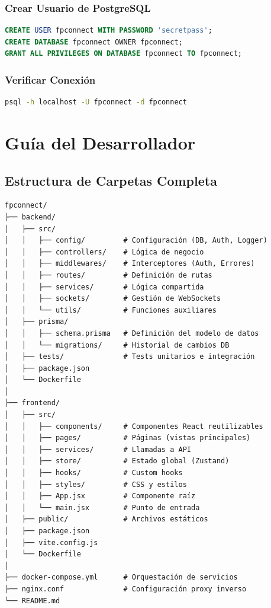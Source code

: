 \documentclass[a4paper]{report}
\begin{document}
\subsection{Crear Usuario de PostgreSQL}

\begin{lstlisting}[language=sql]
CREATE USER fpconnect WITH PASSWORD 'secretpass';
CREATE DATABASE fpconnect OWNER fpconnect;
GRANT ALL PRIVILEGES ON DATABASE fpconnect TO fpconnect;
\end{lstlisting}

\subsection{Verificar Conexión}

\begin{lstlisting}[language=bash]
psql -h localhost -U fpconnect -d fpconnect
\end{lstlisting}

\newpage

\chapter{Guía del Desarrollador}

\section{Estructura de Carpetas Completa}

\begin{lstlisting}[language=text]
fpconnect/
├── backend/
│   ├── src/
│   │   ├── config/         # Configuración (DB, Auth, Logger)
│   │   ├── controllers/    # Lógica de negocio
│   │   ├── middlewares/    # Interceptores (Auth, Errores)
│   │   ├── routes/         # Definición de rutas
│   │   ├── services/       # Lógica compartida
│   │   ├── sockets/        # Gestión de WebSockets
│   │   └── utils/          # Funciones auxiliares
│   ├── prisma/
│   │   ├── schema.prisma   # Definición del modelo de datos
│   │   └── migrations/     # Historial de cambios DB
│   ├── tests/              # Tests unitarios e integración
│   ├── package.json
│   └── Dockerfile
│
├── frontend/
│   ├── src/
│   │   ├── components/     # Componentes React reutilizables
│   │   ├── pages/          # Páginas (vistas principales)
│   │   ├── services/       # Llamadas a API
│   │   ├── store/          # Estado global (Zustand)
│   │   ├── hooks/          # Custom hooks
│   │   ├── styles/         # CSS y estilos
│   │   ├── App.jsx         # Componente raíz
│   │   └── main.jsx        # Punto de entrada
│   ├── public/             # Archivos estáticos
│   ├── package.json
│   ├── vite.config.js
│   └── Dockerfile
│
├── docker-compose.yml      # Orquestación de servicios
├── nginx.conf              # Configuración proxy inverso
└── README.md
\end{lstlisting}
\end{document}
